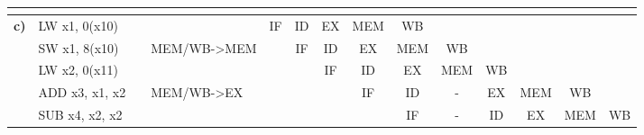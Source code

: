 \documentclass{article}
\begin{document}
\begin{table}[h]
{\begin{tabular}{|l|l|l|l|l|l|c|c|c|c|c|c|l|l|}
                                             &                       &                         &                          &                         &                         & \multicolumn{1}{l|}{} & \multicolumn{1}{l|}{} & \multicolumn{1}{l|}{} & \multicolumn{1}{l|}{} & \multicolumn{1}{l|}{} & \multicolumn{1}{l|}{} &                          &                         \\ \hline
    \textbf{c)}                              & LW  x1, 0(x10)        &                         &                          & \multicolumn{1}{c|}{IF} & \multicolumn{1}{c|}{ID} & EX                    & MEM                   & WB                    & \multicolumn{1}{l|}{} & \multicolumn{1}{l|}{} & \multicolumn{1}{l|}{} &                          &                         \\ \hline
                                             & SW  x1, 8(x10)        &                         & MEM/WB-\textgreater{}MEM &                         & \multicolumn{1}{c|}{IF} & ID                    & EX                    & MEM                   & WB                    &                       &                       &                          &                         \\ \hline
                                             & LW  x2, 0(x11)        &                         &                          &                         &                         & IF                    & ID                    & EX                    & MEM                   & WB                    & \multicolumn{1}{l|}{} &                          &                         \\ \hline
    \textbf{}                                & ADD x3, x1, x2        &                         & MEM/WB-\textgreater{}EX  &                         &                         & \multicolumn{1}{l|}{} & IF                    & ID                    & -                     & EX                    & MEM                   & \multicolumn{1}{c|}{WB}  & \multicolumn{1}{c|}{}   \\ \hline
                                             & SUB x4, x2, x2        &                         &                          &                         &                         & \multicolumn{1}{l|}{} & \multicolumn{1}{l|}{} & IF                    & -                     & ID                    & EX                    & \multicolumn{1}{c|}{MEM} & \multicolumn{1}{c|}{WB} \\ \hline
    \end{tabular}%
    }
\end{table}
\end{document}
